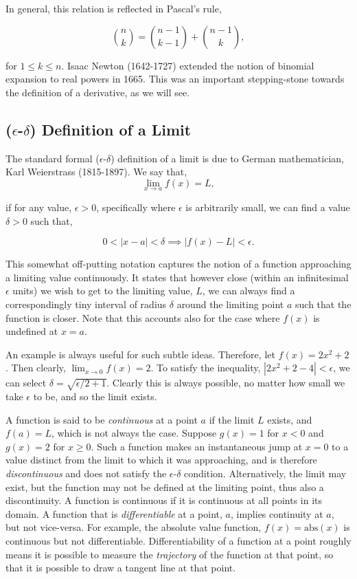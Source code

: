 \documentclass[11pt]{amsart}
\begin{document}
In general, this relation is reflected in Pascal's rule,

$${{n}\choose{k}} = {{n-1}\choose{k-1}} + {{n-1}\choose{k}},$$
		
for $1 \leq k \leq n$. Isaac Newton (1642-1727) extended the notion of binomial expansion to real powers in 1665. This was an important stepping-stone towards the definition of a derivative, as we will see.

\subsection{($\epsilon$-$\delta$) Definition of a Limit}

The standard formal ($\epsilon$-$\delta$) definition of a limit is due to German mathematician, Karl Weierstrass (1815-1897). We say that, $$\lim_{x \to a} f(x) = L,$$

if for any value, $\epsilon > 0$, specifically where $\epsilon$ is arbitrarily small, we can find a value $\delta > 0$ such that,

$$0 < |x - a| < \delta \implies |f(x) - L| < \epsilon.$$

This somewhat off-putting notation captures the notion of a function approaching a limiting value continuously. It states that however close (within an infinitesimal $\epsilon$ units) we wish to get to the limiting value, $L$, we can always find a correspondingly tiny interval of radius $\delta$ around the limiting point $a$ such that the function is closer. Note that this accounts also for the case where $f(x)$ is undefined at $x = a$.

An example is always useful for such subtle ideas. Therefore, let $f(x) = 2x^2 + 2$. Then clearly, $\lim_{x \to 0} f(x) = 2$. To satisfy the inequality, $|2x^2 + 2 - 4| < \epsilon$, we can select $\delta = \sqrt{\epsilon/2 + 1}$. Clearly this is always possible, no matter how small we take $\epsilon$ to be, and so the limit exists.

A function is said to be \emph{continuous} at a point $a$ if the limit $L$ exists, and $f(a) = L$, which is not always the case. Suppose $g(x) = 1$ for $x <0$ and $g(x) = 2$ for $x \geq 0$. Such a function makes an instantaneous jump at $x = 0$ to a value distinct from the limit to which it was approaching, and is therefore \emph{discontinuous} and does not satisfy the $\epsilon$-$\delta$ condition. Alternatively, the limit may exist, but the function may not be defined at the limiting point, thus also a discontinuity. A function is continuous if it is continuous at all points in its domain. A function that is \emph{differentiable} at a point, $a$, implies continuity at $a$, but not vice-versa. For example, the absolute value function, $f(x) = \text{abs}(x)$ is continuous but not differentiable. Differentiability of a function at a point roughly means it is possible to measure the \emph{trajectory} of the function at that point, so that it is possible to draw a tangent line at that point.
\end{document}
